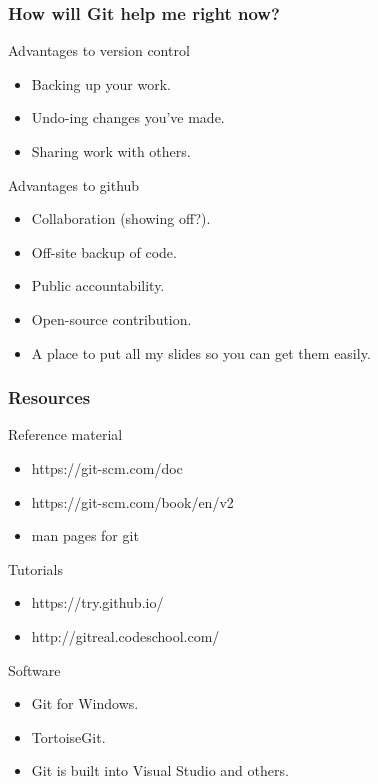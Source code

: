 \documentclass{beamer}
\begin{document}
\begin{frame}
  \frametitle{How will Git help me right now?}

  \begin{block}{Advantages to version control}
    \begin{itemize}  
      \item Backing up your work.
      \item Undo-ing changes you've made.
      \item Sharing work with others.
    \end{itemize}
  \end{block}

  \begin{block}{Advantages to github}
    \begin{itemize}  
      \item Collaboration (showing off?).
      \item Off-site backup of code.
      \item Public accountability.
      \item Open-source contribution.
      \item A place to put all my slides so you can get them easily.
    \end{itemize}
  \end{block}

\end{frame}

\begin{frame}
  \frametitle{Resources}

  \begin{block}{Reference material}
    \begin{itemize}
      \item https://git-scm.com/doc
      \item https://git-scm.com/book/en/v2
      \item man pages for git
    \end{itemize}
  \end{block}

  \begin{block}{Tutorials}
    \begin{itemize}  
      \item https://try.github.io/
      \item http://gitreal.codeschool.com/
    \end{itemize}
  \end{block}

  \begin{block}{Software}
   \begin{itemize}  
      \item Git for Windows.
      \item TortoiseGit.
      \item Git is built into Visual Studio and others.
    \end{itemize}

  \end{block}
\end{frame}
\end{document}
